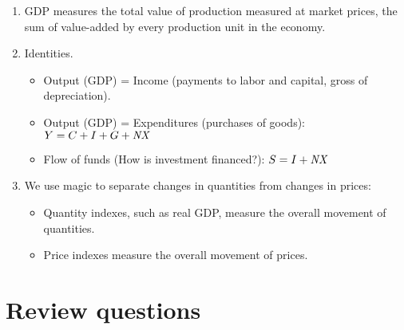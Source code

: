\setlength{\leftmargini}{.5\oldleftmargini}
\begin{enumerate}
\item GDP measures the total value of production measured at market prices,
the sum of value-added by every production unit in the economy.

\item Identities.

   \begin{itemize}

   \item Output (GDP) = Income (payments to labor and capital,
   gross of depreciation).

   \item Output (GDP) = Expenditures (purchases of goods):  $Y = C+I+G+\mbox{\em NX\/}$

   \item Flow of funds (How is investment financed?):  $S =I + \mbox{\em NX\/}$

   \end{itemize}

\item We use magic to separate changes in quantities from changes in prices:
\begin{itemize}
\item Quantity indexes, such as real GDP, measure the overall movement of quantities.
\item Price indexes measure the overall movement of prices.
\end{itemize}

\end{enumerate}
\setlength{\leftmargini}{\oldleftmargini}


\section*{Review questions}

